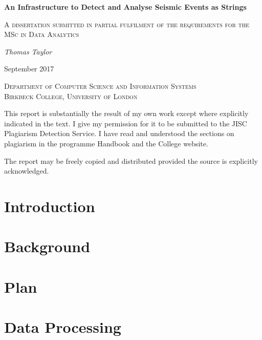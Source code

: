 \documentclass[11pt, a4paper]{scrartcl}
\begin{document}
\begin{titlepage}
	\centering
	{\huge\bfseries An Infrastructure to Detect and Analyse Seismic Events as Strings\par}
	\vspace{1cm}
	{\scshape\Large A dissertation submitted in partial fulfilment of the requirements for the MSc in Data Analytics\par}
	\vspace{1.5cm}
	{\Large\itshape Thomas Taylor\par}
	{\large September 2017\par}
	\vspace{2cm}	{\scshape\LARGE Department of Computer Science and Information Systems \\ Birkbeck College, University of London \par}

	\vfill

	\begin{itshape}
		\noindent This report is substantially the result of my own work except where explicitly indicated in the text. I give my permission for it to be submitted to the JISC Plagiarism Detection Service. I have read and understood the sections on plagiarism in the programme Handbook and the College website.
		
		\noindent The report may be freely copied and distributed provided the source is explicitly acknowledged.
	\end{itshape}
	

\end{titlepage}

\tableofcontents
\listoffigures
\newpage

\section{Introduction}


\section{Background}






\section{Plan}


\section{Data Processing}





\end{document}
